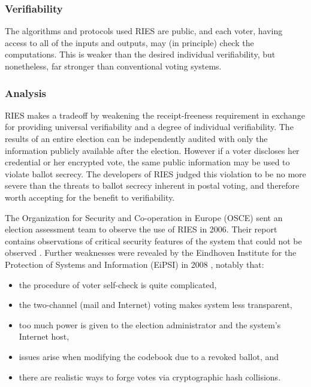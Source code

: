 \subsubsection{Verifiability}

The algorithms and protocols used RIES are public, and each voter,
having access to all of the inputs and outputs, may (in principle)
check the computations. This is weaker than the desired individual
verifiability, but nonetheless, far stronger than
conventional voting systems.

\subsubsection{Analysis}

RIES makes a tradeoff by weakening the receipt-freeness requirement in
exchange for providing universal verifiability and a degree of
individual verifiability. The results of an entire election can be
independently audited with only the information publicly available
after the election. However if a voter discloses her credential or her
encrypted vote, the same public information may be used to violate
ballot secrecy. The developers of RIES judged this violation to be no
more severe than the threats to ballot secrecy inherent in postal
voting, and therefore worth accepting for the benefit to
verifiability.

The Organization for Security and Co-operation in Europe (OSCE) sent
an election assessment team to observe the use of RIES in 2006. Their
report contains observations of critical security features of the
system that could not be observed \cite{osce2007}. Further
weaknesses were revealed by the Eindhoven Institute for the Protection
of Systems and Information (EiPSI) in 2008 \cite{hubbers2008},
notably that:

\begin{itemize}
  \item the procedure of voter self-check is quite complicated,
  \item the two-channel (mail and Internet) voting makes system less
    transparent,
  \item too much power is given to the election administrator and the
    system's Internet host,
  \item issues arise when modifying the codebook due to a revoked
    ballot, and
  \item there are realistic ways to forge votes via cryptographic hash
    collisions.
\end{itemize}

